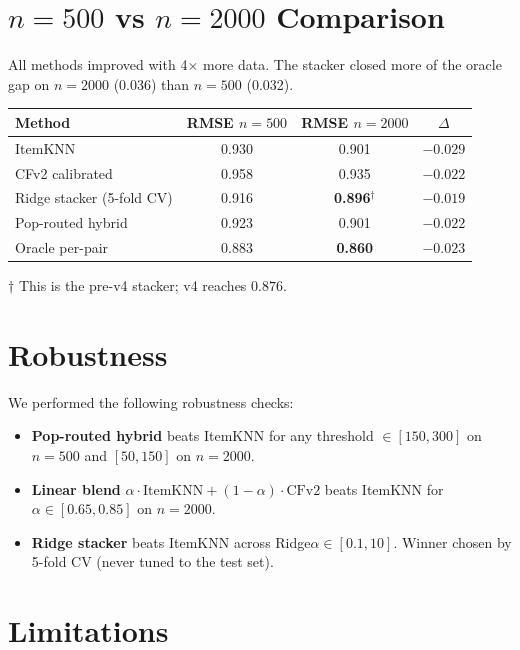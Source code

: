 \documentclass[11pt,a4paper]{article}
\newcommand{\best}[1]{\textcolor{goodgreen}{\textbf{#1}}}
\begin{document}
\section{$n=500$ vs $n=2000$ Comparison}
All methods improved with 4$\times$ more data. The stacker closed more of
the oracle gap on $n=2000$ (0.036) than $n=500$ (0.032).
\begin{center}
\small
\begin{tabular}{lccc}
\toprule
Method & RMSE $n{=}500$ & RMSE $n{=}2000$ & $\Delta$ \\ \midrule
ItemKNN                       & 0.930 & 0.901 & $-0.029$ \\
CFv2 calibrated               & 0.958 & 0.935 & $-0.022$ \\
Ridge stacker (5-fold CV)     & 0.916 & \best{0.896}$^\dagger$ & $-0.019$ \\
Pop-routed hybrid             & 0.923 & 0.901 & $-0.022$ \\
Oracle per-pair               & 0.883 & \best{0.860} & $-0.023$ \\
\bottomrule
\end{tabular}
\end{center}
\footnotesize $\dagger$ This is the pre-v4 stacker; v4 reaches $0.876$.

\section{Robustness}

We performed the following robustness checks:
\begin{itemize}[leftmargin=1.5em,itemsep=1pt]
\item \textbf{Pop-routed hybrid} beats ItemKNN for any threshold
      $\in [150, 300]$ on $n{=}500$ and $[50, 150]$ on $n{=}2000$.
\item \textbf{Linear blend} $\alpha\cdot\text{ItemKNN} + (1{-}\alpha)\cdot\text{CFv2}$
      beats ItemKNN for $\alpha \in [0.65, 0.85]$ on $n{=}2000$.
\item \textbf{Ridge stacker} beats ItemKNN across
      Ridge$\alpha \in [0.1, 10]$. Winner chosen by 5-fold CV
      (never tuned to the test set).
\end{itemize}

\section{Limitations}
\label{sec:limitations}
\end{document}
